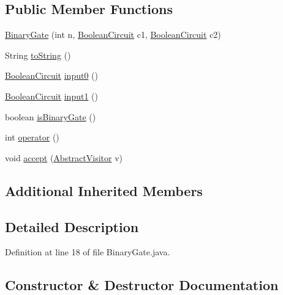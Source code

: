 \subsection*{Public Member Functions}
\begin{DoxyCompactItemize}
\item 
\hyperlink{classuran_1_1formula_1_1cnf_1_1_binary_gate_a5328f117f419aed43f46810c6eb64800}{Binary\+Gate} (int n, \hyperlink{classuran_1_1formula_1_1cnf_1_1_boolean_circuit}{Boolean\+Circuit} c1, \hyperlink{classuran_1_1formula_1_1cnf_1_1_boolean_circuit}{Boolean\+Circuit} c2)
\item 
String \hyperlink{classuran_1_1formula_1_1cnf_1_1_binary_gate_a80351a9a44c1169bf5fb33bbb37402f5}{to\+String} ()
\item 
\hyperlink{classuran_1_1formula_1_1cnf_1_1_boolean_circuit}{Boolean\+Circuit} \hyperlink{classuran_1_1formula_1_1cnf_1_1_binary_gate_abd94a491dcf0817140225d38234c6cf8}{input0} ()
\item 
\hyperlink{classuran_1_1formula_1_1cnf_1_1_boolean_circuit}{Boolean\+Circuit} \hyperlink{classuran_1_1formula_1_1cnf_1_1_binary_gate_a85ac51e7db1b845ce851ac87fc972353}{input1} ()
\item 
boolean \hyperlink{classuran_1_1formula_1_1cnf_1_1_binary_gate_a4136bcf8f1cc242690331bfa428442fd}{is\+Binary\+Gate} ()
\item 
int \hyperlink{classuran_1_1formula_1_1cnf_1_1_binary_gate_adfd7457fdeba97281ec208de217382e9}{operator} ()
\item 
void \hyperlink{classuran_1_1formula_1_1cnf_1_1_binary_gate_a62e1df3f6df1ae5846de86fe23d42491}{accept} (\hyperlink{classuran_1_1formula_1_1cnf_1_1visitor_1_1_abstract_visitor}{Abstract\+Visitor} v)
\end{DoxyCompactItemize}
\subsection*{Additional Inherited Members}


\subsection{Detailed Description}


Definition at line 18 of file Binary\+Gate.\+java.



\subsection{Constructor \& Destructor Documentation}
\hypertarget{classuran_1_1formula_1_1cnf_1_1_binary_gate_a5328f117f419aed43f46810c6eb64800}{}
